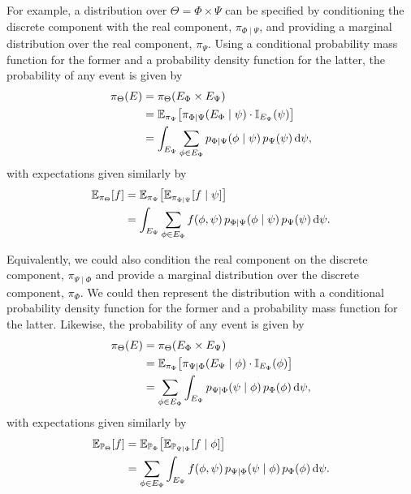 For example, a distribution over $\Theta = \Phi \times \Psi$ can be
specified by conditioning the discrete component with the real
component, $\pi_{\Phi \mid \Psi}$, and providing a marginal distribution
over the real component, $\pi_{\Psi}$.  Using a conditional
probability mass function for the former and a probability density function
for the latter, the probability of any event is given by
%
\begin{align*}
\pi_{\Theta} \! \left( E \right)
&=
\pi_{\Theta} \! \left( E_{\Phi} \times E_{\Psi} \right)
\\
&=
\mathbb{E}_{\pi_{\Psi}} \! \left[
\pi_{\Phi \mid \Psi} \! \left(  E_{\Phi} \mid \psi \right)
\cdot
\mathbb{I}_{E_{\Psi}} \! \left( \psi \right)
\right] 
\\
&= 
\int_{E_{\Psi} }
\sum_{\phi \in E_{\Phi} } p_{\Phi \mid \Psi} \! \left( \phi \mid \psi \right)
p_{\Psi} \! \left( \psi \right) \mathrm{d} \psi,
\end{align*}
%
with expectations given similarly by
%
\begin{align*}
\mathbb{E}_{\pi_{\Theta}} \! \left[ f \right]
&=
\mathbb{E}_{\pi_{\Psi}} \! \left[
\mathbb{E}_{\pi_{\Phi \mid \Psi}} \! \left[  f \mid \psi \right]
\right] 
\\
&= 
\int_{E_{\Psi} } \sum_{\phi \in E_{\Phi} } f \! \left( \phi, \psi \right) 
p_{\Phi \mid \Psi} \! \left( \phi \mid \psi \right)
p_{\Psi} \! \left( \psi \right) \mathrm{d} \psi.
\end{align*}

Equivalently, we could also condition the real component on the
discrete component, $\pi_{\Psi \mid \Phi}$ and provide a marginal 
distribution over the discrete component, $\pi_{\Phi}$.  We could 
then represent the distribution with a conditional probability density 
function for the former and a probability mass function for the latter.  
Likewise, the probability of any event is given by
%
\begin{align*}
\pi_{\Theta} \! \left( E \right)
&=
\pi_{\Theta} \! \left( E_{\Phi} \times E_{\Psi} \right)
\\
&=
\mathbb{E}_{\pi_{\Phi}} \! \left[
\pi_{\Psi \mid \Phi} \! \left(  E_{\Psi} \mid \phi \right)
\cdot
\mathbb{I}_{E_{\Phi}} \! \left( \phi \right)
\right] 
\\
&= 
\sum_{\phi \in E_{\Phi} } \int_{E_{\Psi} }
p_{\Psi \mid \Phi} \! \left( \psi \mid \phi \right) 
p_{\Phi} \! \left( \phi \right) \mathrm{d} \psi,
\end{align*}
%
with expectations given similarly by
%
\begin{align*}
\mathbb{E}_{\mathbb{P}_{\Theta}} \! \left[ f \right]
&=
\mathbb{E}_{\mathbb{P}_{\Phi}} \! \left[
\mathbb{E}_{\mathbb{P}_{\Psi \mid \Phi}} \! \left[  f \mid \phi \right]
\right] 
\\
&= 
\sum_{\phi \in E_{\Phi} } \int_{E_{\Psi} }
f \! \left( \phi, \psi \right) 
p_{\Psi \mid \Phi} \! \left( \psi \mid \phi \right)
p_{\Phi} \! \left( \phi \right) \mathrm{d} \psi.
\end{align*}


